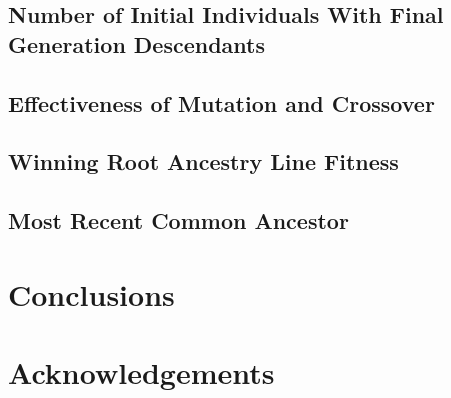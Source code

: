 \documentclass[12pt]{article}
\begin{document}
\subsection{Number of Initial Individuals With Final Generation Descendants} \label{Number Initial Individuals With Descendants}

\subsection{Effectiveness of Mutation and Crossover} \label{Effectiveness Mutation Crossover}

\subsection{Winning Root Ancestry Line Fitness} \label{Winning Root Line Fitness}

\subsection{Most Recent Common Ancestor} \label{Most Recent Common Ancestor}

\section{Conclusions} \label{Conclusions}

\section*{Acknowledgements}

\pagebreak



\end{document}
